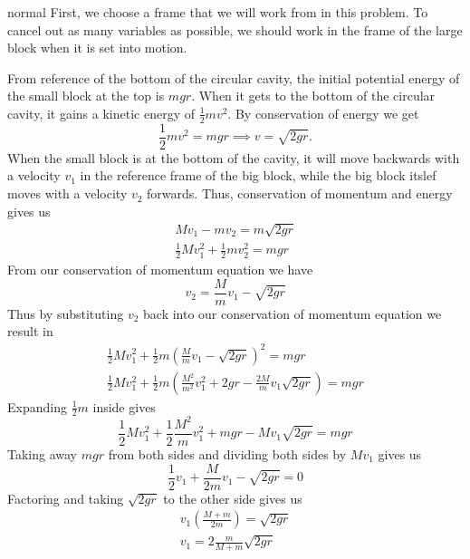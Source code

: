 \begin{solution}{normal}
First, we choose a frame that we will work from in this problem. To cancel out as many variables as possible, we should work in the frame of the large block when it is set into motion. 
\vspace{2mm}

From reference of the bottom of the circular cavity, the initial potential energy of the small block at the top is $mgr$. When it gets to the bottom of the circular cavity, it gains a kinetic energy of $\frac{1}{2}mv^2$. By conservation of energy we get
\[\frac{1}{2}mv^2=mgr\implies v=\sqrt{2gr}.\]
When the small block is at the bottom of the cavity, it will move backwards with a velocity $v_1$ in the reference frame of the big block, while the big block itslef moves with a velocity $v_2$ forwards. Thus, conservation of momentum and energy gives us
\begin{align*}
Mv_1-mv_2=m\sqrt{2gr}\\
\frac{1}{2}Mv_1^2+\frac{1}{2}mv_2^2=mgr
\end{align*}
From our conservation of momentum equation we have
\[v_2=\frac{M}{m}v_1-\sqrt{2gr}\]
Thus by substituting $v_2$ back into our conservation of momentum equation we result in 
\begin{align*}
\frac{1}{2}Mv_1^2+\frac{1}{2}m\left(\frac{M}{m}v_1-\sqrt{2gr}\right)^2=mgr\\
\frac{1}{2}Mv_1^2+\frac{1}{2}m\left(\frac{M^2}{m^2}v_1^2+2gr-\frac{2M}{m}v_1\sqrt{2gr}\right)=mgr
\end{align*}
Expanding $\frac{1}{2}m$ inside gives
\[\frac{1}{2}Mv_1^2+\frac{1}{2}\frac{M^2}{m}v_1^2+mgr-Mv_1\sqrt{2gr}=mgr\]
Taking away $mgr$ from both sides and dividing both sides by $Mv_1$ gives us
\[\frac{1}{2}v_1+\frac{M}{2m}v_1-\sqrt{2gr}=0\]
Factoring and taking $\sqrt{2gr}$ to the other side gives us
\begin{align*}
v_1\left(\frac{M+m}{2m}\right)=\sqrt{2gr}\\
\boxed{v_1=2\frac{m}{M+m}\sqrt{2gr}}
\end{align*}
\end{solution}
